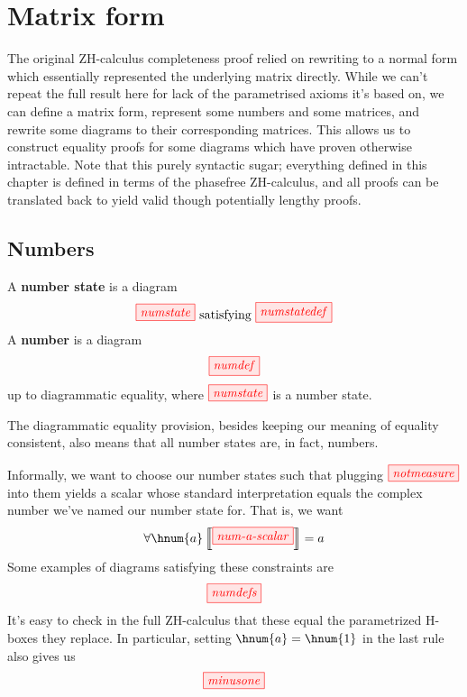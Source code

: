 \chapter{Matrix form}\label{chap:matrices}
The original ZH-calculus completeness proof relied on rewriting to a normal form
which essentially represented the underlying matrix directly. While we can't
repeat the full result here for lack of the parametrised axioms it's based on,
we can define a matrix form, represent some numbers and some matrices, and
rewrite some diagrams to their corresponding matrices. This allows us to
construct equality proofs for some diagrams which have proven otherwise
intractable. Note that this purely syntactic sugar; everything defined in this
chapter is defined in terms of the phasefree ZH-calculus, and all proofs can be
translated back to yield valid though potentially lengthy proofs.

\section{Numbers}

\begin{definition}
    A \textbf{number state} is a diagram
    $$\tikzfig{numstate} \text{ satisfying } \tikzfig{numstatedef}$$
    A \textbf{number} is a diagram 
    $$\tikzfig{numdef}$$
    up to diagrammatic equality, where $\tikzfig{numstate}$ is a number state.
\end{definition}
\begin{remark*}
    The diagrammatic equality provision, besides keeping our meaning of equality
    consistent, also means that all number states are, in fact, numbers.
\end{remark*}

Informally, we want to choose our number states such that plugging
$\tikzfig{notmeasure}$ into them yields a scalar whose standard interpretation
equals the complex number we've named our number state for. That is, we want
$$\forall \hnum{a} \intf{\tikzfig{num-a-scalar}} = a$$
Some examples of diagrams satisfying these constraints are
$$\tikzfig{numdefs}$$
It's easy to check in the full ZH-calculus that these equal the parametrized
H-boxes they replace. In particular, setting $\hnum{a} = \hnum{1}$ in the last
rule also gives us
$$\tikzfig{minusone}$$


